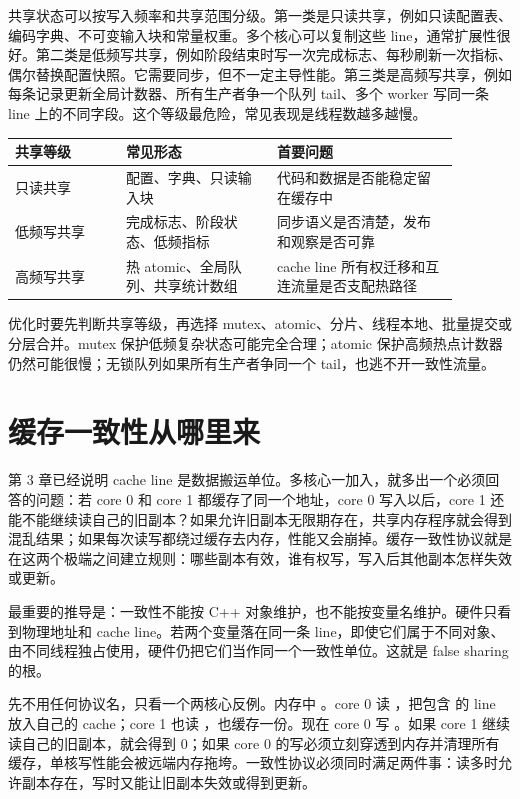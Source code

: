 共享状态可以按写入频率和共享范围分级。第一类是只读共享，例如只读配置表、编码字典、不可变输入块和常量权重。多个核心可以复制这些 line，通常扩展性很好。第二类是低频写共享，例如阶段结束时写一次完成标志、每秒刷新一次指标、偶尔替换配置快照。它需要同步，但不一定主导性能。第三类是高频写共享，例如每条记录更新全局计数器、所有生产者争一个队列 tail、多个 worker 写同一条 line 上的不同字段。这个等级最危险，常见表现是线程数越多越慢。

\begin{center}
\begin{tabular}{p{0.22\linewidth}p{0.30\linewidth}p{0.36\linewidth}}
\toprule
共享等级 & 常见形态 & 首要问题 \\
\midrule
只读共享 & 配置、字典、只读输入块 & 代码和数据是否能稳定留在缓存中 \\
低频写共享 & 完成标志、阶段状态、低频指标 & 同步语义是否清楚，发布和观察是否可靠 \\
高频写共享 & 热 atomic、全局队列、共享统计数组 & cache line 所有权迁移和互连流量是否支配热路径 \\
\bottomrule
\end{tabular}
\end{center}

优化时要先判断共享等级，再选择 mutex、atomic、分片、线程本地、批量提交或分层合并。mutex 保护低频复杂状态可能完全合理；atomic 保护高频热点计数器仍然可能很慢；无锁队列如果所有生产者争同一个 tail，也逃不开一致性流量。

\section{缓存一致性从哪里来}

第 3 章已经说明 cache line 是数据搬运单位。多核心一加入，就多出一个必须回答的问题：若 core 0 和 core 1 都缓存了同一个地址，core 0 写入以后，core 1 还能不能继续读自己的旧副本？如果允许旧副本无限期存在，共享内存程序就会得到混乱结果；如果每次读写都绕过缓存去内存，性能又会崩掉。缓存一致性协议就是在这两个极端之间建立规则：哪些副本有效，谁有权写，写入后其他副本怎样失效或更新。

最重要的推导是：一致性不能按 C++ 对象维护，也不能按变量名维护。硬件只看到物理地址和 cache line。若两个变量落在同一条 line，即使它们属于不同对象、由不同线程独占使用，硬件仍把它们当作同一个一致性单位。这就是 false sharing 的根。

先不用任何协议名，只看一个两核心反例。内存中 。core 0 读 ，把包含  的 line 放入自己的 cache；core 1 也读 ，也缓存一份。现在 core 0 写 。如果 core 1 继续读自己的旧副本，就会得到 0；如果 core 0 的写必须立刻穿透到内存并清理所有缓存，单核写性能会被远端内存拖垮。一致性协议必须同时满足两件事：读多时允许副本存在，写时又能让旧副本失效或得到更新。


